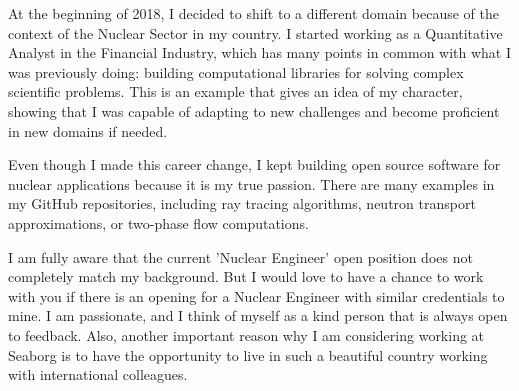\documentclass[11pt, a4paper]{templates/awesome-cv}
\begin{document}
\begin{cvletter}
At the beginning of 2018, I decided to shift to a different domain because of the context of
the Nuclear Sector in my country. I started working as a Quantitative Analyst in the
Financial Industry, which has many points in common with what I was previously doing:
building computational libraries for solving complex scientific problems. This is an example
that gives an idea of my character, showing that I was capable of adapting to new challenges
and become proficient in new domains if needed.

Even though I made this career change, I kept building open source software for nuclear
applications because it is my true passion. There are many examples in my GitHub
repositories, including ray tracing algorithms, neutron transport approximations, or
two-phase flow computations.

I am fully aware that the current 'Nuclear Engineer' open position does not completely match
my background. But I would love to have a chance to work with you if there is an opening for
a Nuclear Engineer with similar credentials to mine. I am passionate, and I think of myself
as a kind person that is always open to feedback. Also, another important reason why I am
considering working at Seaborg is to have the opportunity to live in such a beautiful
country working with international colleagues.

\end{cvletter}


\makeletterclosing
\end{document}
